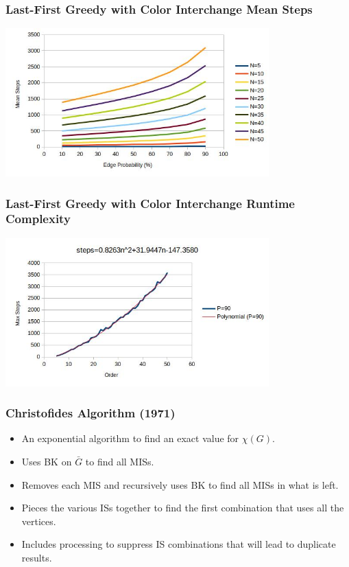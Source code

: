 \documentclass{beamer}
\newcommand{\X}{\chi}
\begin{document}
\begin{frame}
  \frametitle{Last-First Greedy with Color Interchange Mean Steps}
  \begin{center}
    \includegraphics[width=4in]{../final/greedyint_steps}
  \end{center}
\end{frame}

\begin{frame}
  \frametitle{Last-First Greedy with Color Interchange Runtime Complexity}
  \begin{center}
    \includegraphics[width=4in]{../final/greedyint_runtime}
  \end{center}
\end{frame}

\begin{frame}
  \frametitle{Christofides Algorithm (1971)}
  \begin{itemize}
  \item An exponential algorithm to find an exact value for \(\X(G)\).
  \item Uses BK on \(\bar{G}\) to find all MISs.
  \item Removes each MIS and recursively uses BK to find all MISs in what is left.
  \item Pieces the various ISs together to find the first combination that uses all the vertices.
  \item Includes processing to suppress IS combinations that will lead to duplicate results.
  \end{itemize}
\end{frame}
\end{document}
